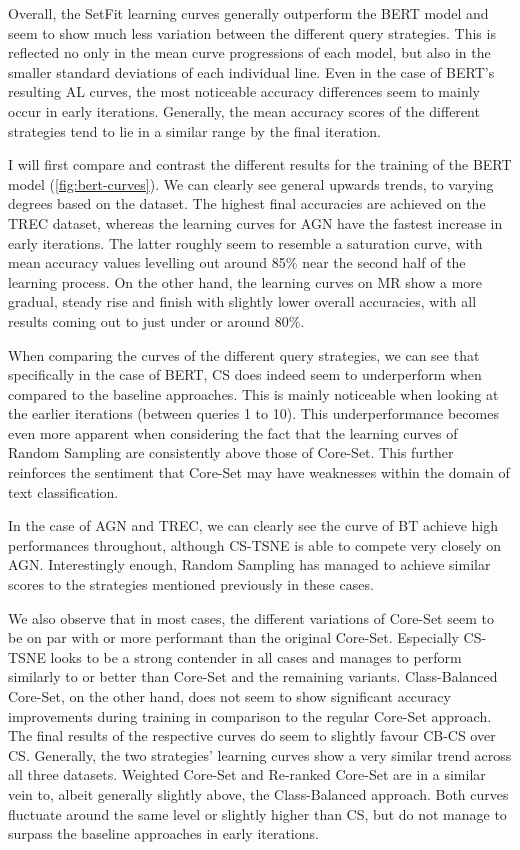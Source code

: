 \documentclass[english,bachelor,ul]{webisthesis} %
\begin{document}
Overall, the SetFit learning curves generally outperform the BERT model and seem to show much less variation between the different query strategies. This is reflected no only in the mean curve progressions of each model, but also in the smaller standard deviations of each individual line. Even in the case of BERT's resulting AL curves, the most noticeable accuracy differences seem to mainly occur in early iterations. Generally, the mean accuracy scores of the different strategies tend to lie in a similar range by the final iteration. 

I will first compare and contrast the different results for the training of the BERT model (\ref{fig:bert-curves}). We can clearly see general upwards trends, to varying degrees based on the dataset. The highest final accuracies are achieved on the TREC dataset, whereas the learning curves for AGN have the fastest increase in early iterations. The latter roughly seem to resemble a saturation curve, with mean accuracy values levelling out around 85\% near the second half of the learning process. On the other hand, the learning curves on MR show a more gradual, steady rise and finish with slightly lower overall accuracies, with all results coming out to just under or around 80\%. 

When comparing the curves of the different query strategies, we can see that specifically in the case of BERT, CS does indeed seem to underperform when compared to the baseline approaches. This is mainly noticeable when looking at the earlier iterations (between queries 1 to 10). This underperformance becomes even more apparent when considering the fact that the learning curves of Random Sampling are consistently above those of Core-Set. This further reinforces the sentiment that Core-Set may have weaknesses within the domain of text classification. 

In the case of AGN and TREC, we can clearly see the curve of BT achieve high performances throughout, although CS-TSNE is able to compete very closely on AGN. Interestingly enough, Random Sampling has managed to achieve similar scores to the strategies mentioned previously in these cases.

We also observe that in most cases, the different variations of Core-Set seem to be on par with or more performant than the original Core-Set. Especially CS-TSNE looks to be a strong contender in all cases and manages to perform similarly to or better than Core-Set and the remaining variants. Class-Balanced Core-Set, on the other hand, does not seem to show significant accuracy improvements during training in comparison to the regular Core-Set approach. The final results of the respective curves do seem to slightly favour CB-CS over CS. Generally, the two strategies' learning curves show a very similar trend across all three datasets. Weighted Core-Set and Re-ranked Core-Set are in a similar vein to, albeit generally slightly above, the Class-Balanced approach. Both curves fluctuate around the same level or slightly higher than CS, but do not manage to surpass the baseline approaches in early iterations.
\end{document}
